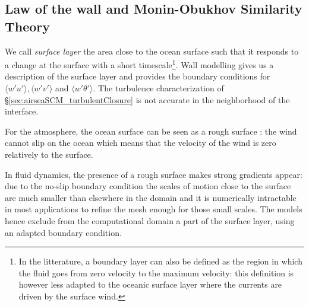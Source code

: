 \subsection{Law of the wall and Monin-Obukhov Similarity Theory}
\label{sec:airseaSCM_WallLaw}
% 
% 
% 
We call \textit{surface layer} the area close to the ocean surface
such that it responds to a change at the surface with a short
timescale\footnote{In the litterature, a boundary layer can also
be defined as the region in which the fluid goes from zero
velocity to the maximum velocity: this definition is however
less adapted to the oceanic surface layer where the currents
are driven by the surface wind.}.
Wall modelling gives us a description of the surface layer
and provides the boundary conditions for
$\langle w' u'\rangle, \langle w' v'\rangle$ and
$\langle w' \theta'\rangle$.
The turbulence characterization of \S \ref{sec:airseaSCM_turbulentClosure}
is not accurate in the neighborhood of the interface.
\par
For the atmosphere, the ocean surface can be seen as a
rough surface : the wind cannot slip on the ocean which
means that the velocity of the wind is zero
relatively to the surface.
\par
{}
\par
In fluid dynamics, the presence of a rough surface makes strong
gradients appear:
due to the no-slip boundary condition
the scales of motion close to the surface are much smaller than
elsewhere in the domain and it is numerically
intractable in most applications
to refine the mesh enough for those small scales.
The models hence exclude from the computational domain
a part of the surface layer, using an adapted boundary
condition.
%
